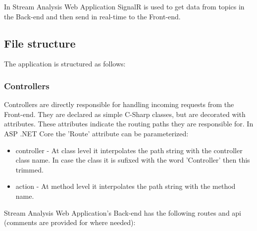 In Stream Analysis Web Application SignalR is used to get data from topics in the Back-end and then send in real-time to the Front-end.

\subsection{File structure}
\label{chap:04:02:03}

The application is structured as follows:


\subsubsection{Controllers}
\label{chap:04:02:03:01}
Controllers are directly responsible for handling incoming requests from the Front-end. They are declared as simple C-Sharp classes, but are decorated with attributes. These attributes indicate the routing paths they are responsible for. In ASP .NET Core the 'Route' attribute can be parameterized:

\begin{itemize}
	\item controller - At class level it interpolates the path string with the controller class name. In case the class it is sufixed with the word 'Controller' then this trimmed.
	\item action - At method level it interpolates the path string with the method name.
\end{itemize}

Stream Analysis Web Application's Back-end has the following routes and api (comments are provided for where needed):\\

